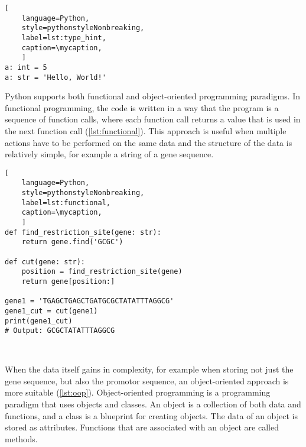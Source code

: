 \def\mycaption{
    Example of type hints used in Python. Explicitly stating the type of the
    variable is optional and does not change the behavior of the code as shown in
    \autoref{lst:dynamic_typing}.}
\begin{lstlisting}[
    language=Python,
    style=pythonstyleNonbreaking,
    label=lst:type_hint,
    caption=\mycaption,
    ]
a: int = 5
a: str = 'Hello, World!'
\end{lstlisting}


Python supports both functional and object-oriented programming paradigms. In
functional programming, the code is written in a way that the program is a
sequence of function calls, where each function call returns a value that is
used in the next function call (\autoref{lst:functional}). This approach is
useful when multiple actions have to be performed on the same data and the
structure of the data is relatively simple, for example a string of a gene
sequence.

\def\mycaption{ Example of functional programming in Python. The code
    defines a function called ``\texttt{find\_restriction\_site}'' that
    finds the position of a restriction site in a gene. The function
    ``\texttt{cut}'' uses the function ``\texttt{find\_restriction\_site}''
    to cut the gene at the restriction site.}
\begin{lstlisting}[
    language=Python,
    style=pythonstyleNonbreaking,
    label=lst:functional,
    caption=\mycaption,
    ]
def find_restriction_site(gene: str):
    return gene.find('GCGC')
    
def cut(gene: str):
    position = find_restriction_site(gene)
    return gene[position:]   
    
gene1 = 'TGAGCTGAGCTGATGCGCTATATTTAGGCG'
gene1_cut = cut(gene1)
print(gene1_cut)
# Output: GCGCTATATTTAGGCG
    
    
\end{lstlisting}


When the data itself gains in complexity, for example when storing not just the
gene sequence, but also the promotor sequence, an object-oriented approach is
more suitable (\autoref{lst:oop}). Object-oriented programming is a programming
paradigm that uses objects and classes. An object is a collection of both data
and functions, and a class is a blueprint for creating objects. The data of an
object is stored as attributes. Functions that are associated with an object are
called methods.

